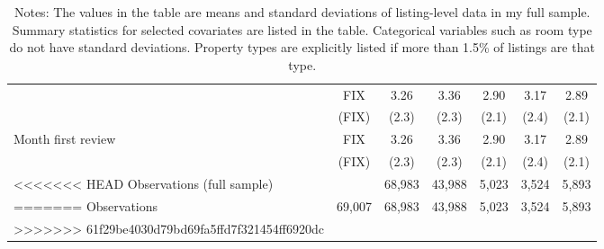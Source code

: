 {\begin{longtable}{l*{6}{c}}
\begin{longtable}{l*{6}{c|c|cccc}}
Year first review    & FIX   &      3.26	&      3.36  &      2.90		&    3.17 		&	 2.89\\
& (FIX)    &     (2.3)         &     (2.3)         &     (2.1)         &     (2.4)         & (2.1)\\
Month first review    & FIX   &      3.26	&      3.36  &      2.90		&    3.17 		&	 2.89\\
& (FIX)    &     (2.3)         &     (2.3)         &     (2.1)         &     (2.4)         & (2.1)\\

\hline
<<<<<<< HEAD
Observations (full sample)  &   & 68,983   &       43,988         &       5,023         &       3,524         &       5,893         \\
=======
Observations  & 69,007  & 68,983   &       43,988         &       5,023         &       3,524   & 5,893      \\
>>>>>>> 61f29be4030d79bd69fa5ffd7f321454ff6920dc
\hline\hline
\caption*{Notes: The values in the table are means and standard deviations of listing-level data in my full sample. Summary statistics for selected covariates are listed in the table. Categorical variables such as room type do not have standard deviations. Property types are explicitly listed if more than 1.5\% of listings are that type.}

\end{longtable}
}
\normalsize



